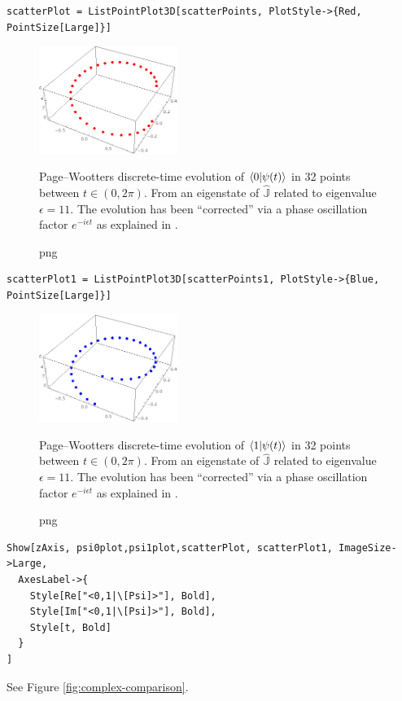 \begin{Verbatim}
scatterPlot = ListPointPlot3D[scatterPoints, PlotStyle->{Red, PointSize[Large]}]
\end{Verbatim}
\begin{figure}[!h]
  \centering
  \includegraphics[width=0.4\textwidth]{img/scatterplot0.png}
  \caption[]{png}{
    Page--Wootters discrete-time evolution of
    $\braket{0}{\psi(t)}$ in 32 points between
    $t \in (0, 2\pi) $. From an eigenstate of
    $\hat{\mathbb{J}}$ related to eigenvalue $\epsilon = 11$.
    The evolution has been ``corrected'' via a phase oscillation
    factor $e^{-i \epsilon t}$
    as explained in \cite[\it ``The Zero-eigenvalue'']{Lloyd:Time}.
  }
\end{figure}

\begin{Verbatim}
scatterPlot1 = ListPointPlot3D[scatterPoints1, PlotStyle->{Blue, PointSize[Large]}]
\end{Verbatim}
\begin{figure}[!h]
  \centering
  \includegraphics[width=0.4\textwidth]{img/scatterplot1.png}
  \caption[]{png}{
    Page--Wootters discrete-time evolution of
    $\braket{1}{\psi(t)}$ in 32 points between
    $t \in (0, 2\pi) $. From an eigenstate of
    $\hat{\mathbb{J}}$ related to eigenvalue $\epsilon = 11$.
    The evolution has been ``corrected'' via a phase oscillation
    factor $e^{-i \epsilon t}$
    as explained in \cite[\it ``The Zero-eigenvalue'']{Lloyd:Time}.
  }
\end{figure}

\begin{Verbatim}
Show[zAxis, psi0plot,psi1plot,scatterPlot, scatterPlot1, ImageSize->Large,
  AxesLabel->{
    Style[Re["<0,1|\[Psi]>"], Bold],
    Style[Im["<0,1|\[Psi]>"], Bold],
    Style[t, Bold]
  }
]
\end{Verbatim}
See Figure \ref{fig:complex-comparison}.